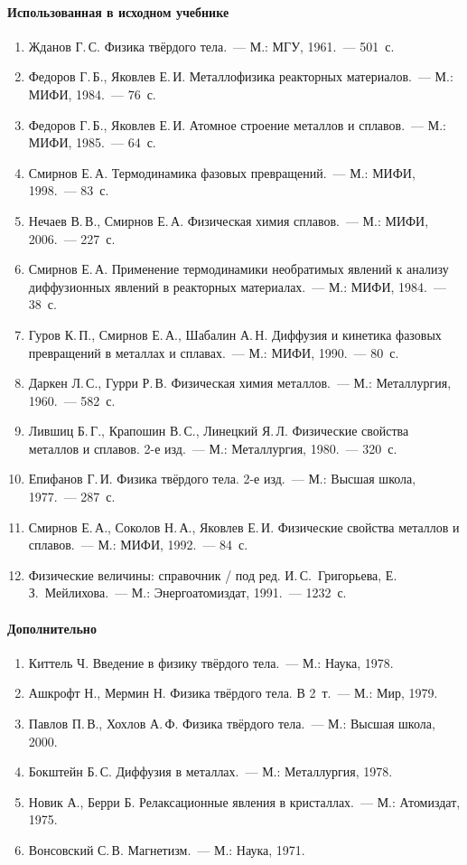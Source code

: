 {\small
\paragraph{Использованная в исходном учебнике}
\begin{enumerate}[label=\arabic*.]
\item Жданов Г.\,С. Физика твёрдого тела.~— М.: МГУ, 1961.~— 501~с.
\item Федоров Г.\,Б., Яковлев Е.\,И. Металлофизика реакторных материалов.~—
М.: МИФИ, 1984.~— 76~с.
\item Федоров Г.\,Б., Яковлев Е.\,И. Атомное строение металлов и
сплавов.~— М.: МИФИ, 1985.~— 64~с.
\item Смирнов Е.\,А. Термодинамика фазовых превращений.~— М.: МИФИ,
1998.~— 83~с.
\item Нечаев В.\,В., Смирнов Е.\,А. Физическая химия сплавов.~— М.: МИФИ,
2006.~— 227~с.
\item Смирнов Е.\,А. Применение термодинамики необратимых явлений к анализу
диффузионных явлений в реакторных материалах.~— М.: МИФИ, 1984.~— 38~с.
\item Гуров К.\,П., Смирнов Е.\,А., Шабалин А.\,Н. Диффузия и кинетика
фазовых превращений в металлах и сплавах.~— М.: МИФИ, 1990.~— 80~с.
\item Даркен Л.\,С., Гурри Р.\,В. Физическая химия металлов.~— М.:
Металлургия, 1960.~— 582~с.
\item Лившиц Б.\,Г., Крапошин В.\,С., Линецкий Я.\,Л. Физические свойства
металлов и сплавов. 2-е изд.~— М.: Металлургия, 1980.~— 320~с.
\item Епифанов Г.\,И. Физика твёрдого тела. 2-е изд.~— М.: Высшая школа,
1977.~— 287~с.
\item Смирнов Е.\,А., Соколов Н.\,А., Яковлев Е.\,И. Физические свойства
металлов и сплавов.~— М.: МИФИ, 1992.~— 84~с.
\item Физические величины: справочник / под ред. И.\,С.~Григорьева,
Е.\,З.~Мейлихова.~— М.: Энергоатомиздат, 1991.~— 1232~с.
\end{enumerate}

\paragraph{Дополнительно}
\begin{enumerate}[label=\arabic*., resume]
\item Киттель Ч. Введение в физику твёрдого тела.~— М.: Наука, 1978.
\item Ашкрофт Н., Мермин Н. Физика твёрдого тела. В 2~т.~— М.: Мир, 1979.
\item Павлов П.\,В., Хохлов А.\,Ф. Физика твёрдого тела.~— М.: Высшая
школа, 2000.
\item Бокштейн Б.\,С. Диффузия в металлах.~— М.: Металлургия, 1978.
\item Новик А., Берри Б. Релаксационные явления в кристаллах.~— М.:
Атомиздат, 1975.
\item Вонсовский С.\,В. Магнетизм.~— М.: Наука, 1971.
\end{enumerate}
}

